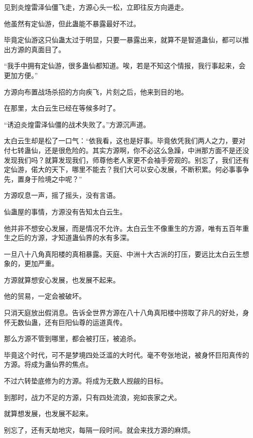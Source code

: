 
\begin{this_body}



见到炎煌雷泽仙僵飞走，方源心头一松，立即往反方向遁走。

他虽然有定仙游，但此蛊能不暴露最好不过。

毕竟定仙游这只仙蛊太过于明显，只要一暴露出来，就算不是智道蛊仙，都可以推出方源的真面目了。

“我手中拥有定仙游，很多蛊仙都知道。唉，若是不知这个情报，我行事起来，会更加方便。”

方源向布置战场杀招的方向疾飞，片刻之后，他来到目的地。

在那里，太白云生已经在等候多时了。

“诱迫炎煌雷泽仙僵的战术失败了。”方源沉声道。

太白云生却是松了一口气：“依我看，这也是好事。毕竟依凭我们两人之力，要对付七转蛊仙，还是很危险的。其实方源啊，你不必这么急躁，中洲那方面不是还没发现我们吗？就算发现我们，师尊他老人家更不会袖手旁观的。别忘了，我们还有定仙游，偌大的天下，哪里不能去？我们大可以安心发展，不断积累。何必事事争先，置身于险境之中呢？”

方源叹息一声，摇了摇头，没有言语。

仙蛊屋的事情，方源没有告知太白云生。

他并非不想安心发展，而是情况不允许。太白云生不像重生的方源，唯有五百年重生之后的方源，才知道蛊仙界的水有多深。

一旦八十八角真阳楼的真相暴露。天庭、中洲十大古派的打压，要远比太白云生想象的，更加严重。

方源就算想安心发展，也发展不起来。

他的贸易，一定会被破坏。

只消天庭放出假消息。告诉全世界方源在八十八角真阳楼中捞取了非凡的好处，身怀无数仙蛊，还有巨阳仙尊的运道真传。

那么方源不管到哪里，都会被打压，被追杀。

毕竟这个时代，可不是梦境四处泛滥的大时代。毫不夸张地说，被身怀巨阳真传的方源。将成为蛊仙界的焦点。

不过六转垫底修为的方源。将成为无数人觊觎的目标。

到那时，战力不足的方源，只有四处流浪，宛如丧家之犬。

就算想发展，也发展不起来。

别忘了，还有天劫地灾，每隔一段时间。就会来找方源的麻烦。


\end{this_body}
